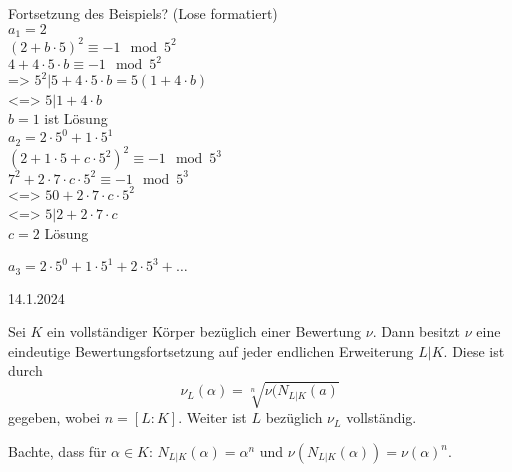 \documentclass[../main.tex]{subfiles}
\begin{document}
Fortsetzung des Beispiels? (Lose formatiert)\\
$a_1=2$ \\
$(2+b\cdot 5)^2\equiv -1 \mod 5^2$\\
$4+4\cdot 5\cdot b \equiv -1 \mod 5^2$\\
=> $5^2| 5+4\cdot 5\cdot b = 5(1+4\cdot b)$\\
<=> $5| 1+4\cdot b$\\
$b=1$ ist Lösung\\

$a_2 = 2 \cdot 5^0+1\cdot 5^1$\\
$(2+1\cdot 5 + c\cdot 5^2)^2\equiv-1 \mod 5^3$\\
$7^2+2\cdot 7\cdot c \cdot 5^2\equiv -1\mod 5^3$\\
<=> $50+2\cdot 7 \cdot c \cdot 5^2$\\
<=>
$5| 2+2\cdot 7\cdot c$\\
$c = 2$ Lösung


$a_3 = 2\cdot 5^0+ 1\cdot 5^1 + 2\cdot 5^3+\dots$

\begin{flushright}
    14.1.2024
\end{flushright}


\begin{theorem}
    Sei $K$ ein vollständiger Körper bezüglich einer Bewertung $\nu$.
    Dann besitzt $\nu$ eine eindeutige Bewertungsfortsetzung auf jeder endlichen Erweiterung $L|K$.
    Diese ist durch $$\nu_L(\alpha) = \sqrt[n]{\nu(N_{L|K}(a)}$$ gegeben, wobei $n=[L:K]$. Weiter ist $L$ bezüglich $\nu_L$ vollständig.
\end{theorem}
Bachte, dass für $\alpha\in K$:
$N_{L|K}(\alpha) = \alpha^n $ und
$\nu(N_{L|K}(\alpha)) = \nu(\alpha)^n$.
\end{document}
